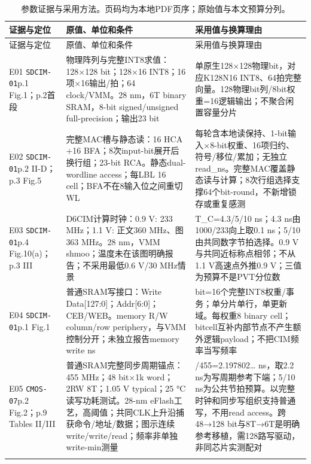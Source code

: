 \begingroup\footnotesize\setlength{\tabcolsep}{3pt}\renewcommand{\arraystretch}{1.08}
\begin{longtable}{@{}>{\raggedright\arraybackslash}p{27mm}>{\raggedright\arraybackslash}p{62mm}>{\raggedright\arraybackslash}p{65mm}@{}}
\caption{参数证据与采用方法。页码均为本地PDF页序；原始值与本文预算分列。}\label{02_sram_dcim:tab:dcim-evidence}\\
\toprule 证据与定位 & 原值、单位和条件 & 采用值与换算理由\\\midrule\endfirsthead
\toprule 证据与定位 & 原值、单位和条件 & 采用值与换算理由\\\midrule\endhead
E01 \texttt{SDCIM-01}\newline p.1 Fig.1；p.2首段 & 物理阵列与完整INT8求值：128×128 bit；128×16 INT8；16项×16输出/拍；64 clock/VMM。28 nm，6T binary SRAM，8-bit signed/unsigned full-precision；输出23 bit & 单原生128×128物理bit，对应K128N16 INT8、64拍完整向量。128物理bit列/8bit权重=16逻辑输出；不聚合闲置容量分片\\\addlinespace[2pt]
E02 \texttt{SDCIM-01}\newline p.2 II-D；p.3 Fig.5 & 完整MAC槽与静态读：16 HCA +16 BFA；8次input-bit展开后换行组；23-bit RCA。静态dual-wordline access；每LBL 16 cell；BFA不在8输入位之间重切WL & 每轮含本地读保持、1-bit输入×8-bit权重、16项归约、符号/移位/累加；无独立read\_ns。完整MAC覆盖静态读与计算；8次行组选择支撑64个bit-round，不新增锁存或重复感测\\\addlinespace[2pt]
E03 \texttt{SDCIM-01}\newline p.4 Fig.10(a)；p.3 III & D6CIM计算时钟：0.9 V: 233 MHz；1.1 V: 正文360 MHz、图363 MHz。28 nm，VMM shmoo；温度未在该图明确报告；不采用最低0.6 V/30 MHz情景 & T\_C=4.3/5/10 ns；4.3 ns由1000/233向上取0.1 ns；5/10由共同数字节拍选择。0.9 V与共同近标称点相邻；不从1.1 V高速点外推0.9 V；三值为预算不是PVT分位数\\\addlinespace[2pt]
E04 \texttt{SDCIM-01}\newline p.1 Fig.1 & 普通SRAM写接口：Write Data[127:0]；Addr[6:0]；CEB/WEB。memory R/W column/row periphery，与VMM控制分开；未独立报告memory write ns & 128 bit=16个完整INT8权重/事务；单分片单行，单更新域。每权重8 binary cell；bitcell互补内部节点不产生额外逻辑payload；不把CIM频率当写频率\\\addlinespace[2pt]
E05 \texttt{CMOS-07}\newline p.2 Fig.2；p.9 Tables II/III & 普通SRAM完整同步周期锚点：455 MHz；48 bit×1k word；2RW 8T；1.05 V typical；25 °C读写功耗测试。28-nm eFlash工艺，高阈值；共同CLK上升沿捕获命令/地址/数据；图示连续write/write/read；频率非单独write-min测量 & 1000/455=2.197802… ns，取2.2 ns为写周期参考下端；5/10 ns为公共节拍预算。以完整时钟和同步写组织支持普通写，不用read access。跨48→128 bit与8T→6T是明确参考移植，需128路写驱动，非同芯片实测配对\\\addlinespace[2pt]

\end{longtable}
